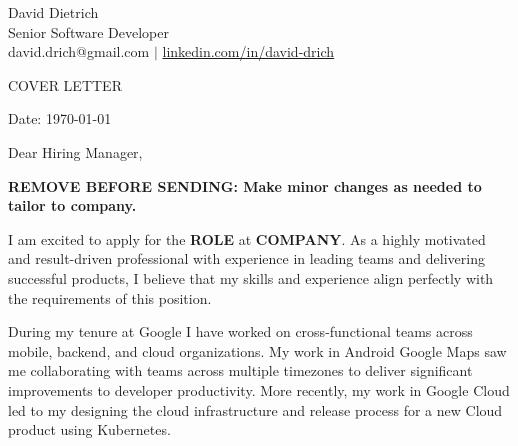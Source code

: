 \documentclass[11pt,a4]{article}
\begin{document}
\begin{center}
    
\centering
{\Huge David Dietrich} \\ %
\vspace{0.1cm}
{\color{UI_blue} \Large{Senior Software Developer}} \\
\vspace{0.1cm}
\large david.drich@gmail.com 
$\vert$
\large {\href{https://www.linkedin.com/in/david-drich/}{linkedin.com/in/david-drich} }

\vspace{-0.15cm} 
{\color{UI_blue} \hrulefill}
\end{center}

\justify
\setlength{\parindent}{0pt}
\setlength{\parskip}{12pt}
\vspace{0.2cm}
\begin{center}
    {\color{UI_blue} \Large{COVER LETTER}}
\end{center}



Date: \today \par \vspace{-0.1cm}
Dear Hiring Manager, %

\textbf{REMOVE BEFORE SENDING: Make minor changes as needed to tailor to company.}

I am excited to apply for the \textbf{ROLE} at \textbf{COMPANY}. As a highly motivated and result-driven professional with experience in leading teams and delivering successful products, I believe that my skills and experience align perfectly with the requirements of this position. \par

During my tenure at Google I have worked on cross-functional teams across mobile, backend, and cloud organizations. My work in Android Google Maps saw me collaborating with teams across multiple timezones to deliver significant improvements to developer productivity. More recently, my work in Google Cloud led to my designing the cloud infrastructure and release process for a new Cloud product using Kubernetes. \par
\end{document}
